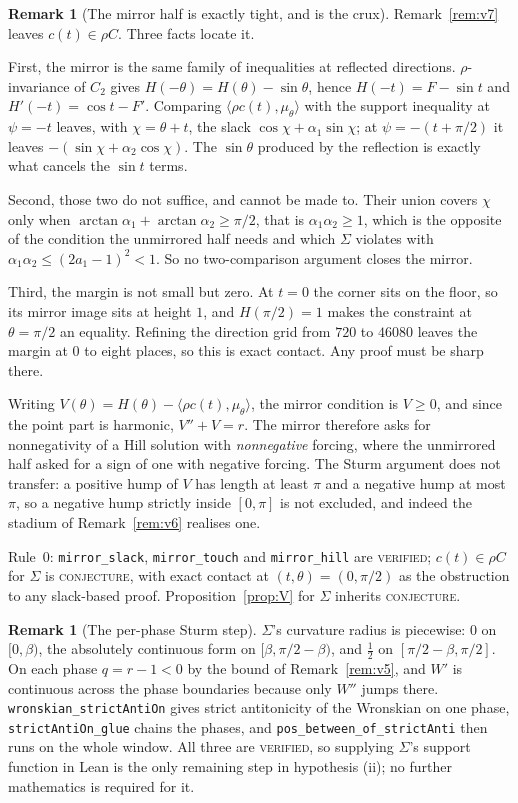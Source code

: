 \documentclass[11pt]{article}
\theoremstyle{definition}
\newtheorem{remark}[theorem]{Remark}
\newcommand{\Sig}{\Sigma}
\begin{document}
\begin{remark}[The mirror half is exactly tight, and is the crux]\label{rem:v8}
Remark~\ref{rem:v7} leaves $c(t)\in\rho C$. Three facts locate it.

First, the mirror is the same family of inequalities at reflected directions. $\rho$-invariance
of $C_2$ gives $H(-\theta)=H(\theta)-\sin\theta$, hence $H(-t)=F-\sin t$ and
$H'(-t)=\cos t-F'$. Comparing $\langle\rho c(t),\mu_\theta\rangle$ with the support inequality
at $\psi=-t$ leaves, with $\chi=\theta+t$, the slack $\cos\chi+\alpha_1\sin\chi$; at
$\psi=-(t+\pi/2)$ it leaves $-(\sin\chi+\alpha_2\cos\chi)$. The $\sin\theta$ produced by the
reflection is exactly what cancels the $\sin t$ terms.

Second, those two do not suffice, and cannot be made to. Their union covers $\chi$ only when
$\arctan\alpha_1+\arctan\alpha_2\ge\pi/2$, that is $\alpha_1\alpha_2\ge1$, which is the
opposite of the condition the unmirrored half needs and which $\Sig$ violates with
$\alpha_1\alpha_2\le(2a_1-1)^2<1$. So no two-comparison argument closes the mirror.

Third, the margin is not small but zero. At $t=0$ the corner sits on the floor, so its mirror
image sits at height $1$, and $H(\pi/2)=1$ makes the constraint at $\theta=\pi/2$ an equality.
Refining the direction grid from $720$ to $46080$ leaves the margin at $0$ to eight places, so
this is exact contact. Any proof must be sharp there.

Writing $V(\theta)=H(\theta)-\langle\rho c(t),\mu_\theta\rangle$, the mirror condition is
$V\ge0$, and since the point part is harmonic, $V''+V=r$. The mirror therefore asks for
nonnegativity of a Hill solution with \emph{nonnegative} forcing, where the unmirrored half
asked for a sign of one with negative forcing. The Sturm argument does not transfer: a
positive hump of $V$ has length at least $\pi$ and a negative hump at most $\pi$, so a
negative hump strictly inside $[0,\pi]$ is not excluded, and indeed the stadium of
Remark~\ref{rem:v6} realises one.

Rule~0: \verb|mirror_slack|, \verb|mirror_touch| and \verb|mirror_hill| are \textsc{verified};
$c(t)\in\rho C$ for $\Sig$ is \textsc{conjecture}, with exact contact at $(t,\theta)=(0,\pi/2)$
as the obstruction to any slack-based proof. Proposition~\ref{prop:V} for $\Sig$ inherits
\textsc{conjecture}.
\end{remark}

\begin{remark}[The per-phase Sturm step]\label{rem:v9}
$\Sig$'s curvature radius is piecewise: $0$ on $[0,\beta)$, the absolutely continuous form on
$[\beta,\pi/2-\beta)$, and $\tfrac12$ on $[\pi/2-\beta,\pi/2]$. On each phase $q=r-1<0$ by the
bound of Remark~\ref{rem:v5}, and $W'$ is continuous across the phase boundaries because only
$W''$ jumps there. \verb|wronskian_strictAntiOn| gives strict antitonicity of the Wronskian on
one phase, \verb|strictAntiOn_glue| chains the phases, and \verb|pos_between_of_strictAnti|
then runs on the whole window. All three are \textsc{verified}, so supplying $\Sig$'s support
function in Lean is the only remaining step in hypothesis (ii); no further mathematics is
required for it.
\end{remark}
\end{document}

